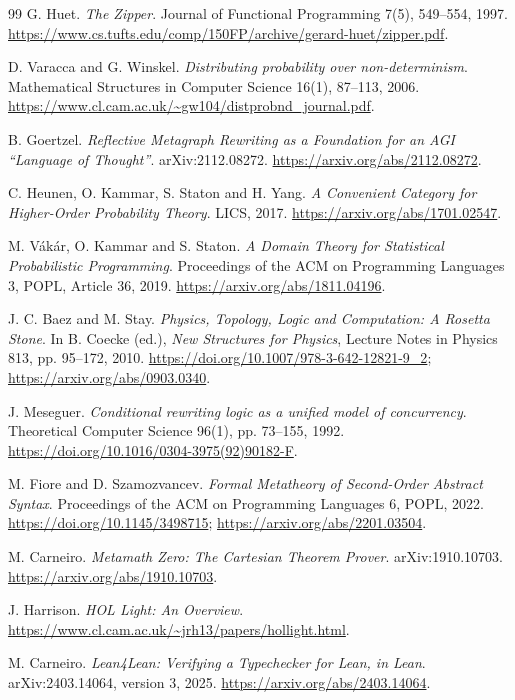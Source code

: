 \documentclass[11pt,a4paper]{article}
\begin{document}
\begin{thebibliography}{99}
G. Huet. \emph{The Zipper}. Journal of Functional Programming 7(5),
549--554, 1997.
\url{https://www.cs.tufts.edu/comp/150FP/archive/gerard-huet/zipper.pdf}.

D. Varacca and G. Winskel. \emph{Distributing probability over
non-determinism}. Mathematical Structures in Computer Science 16(1),
87--113, 2006.
\url{https://www.cl.cam.ac.uk/~gw104/distprobnd_journal.pdf}.

B. Goertzel. \emph{Reflective Metagraph Rewriting as a Foundation for an
AGI ``Language of Thought''}. arXiv:2112.08272.
\url{https://arxiv.org/abs/2112.08272}.

C. Heunen, O. Kammar, S. Staton and H. Yang.
\emph{A Convenient Category for Higher-Order Probability Theory}.
LICS, 2017. \url{https://arxiv.org/abs/1701.02547}.

M. V\'ak\'ar, O. Kammar and S. Staton.
\emph{A Domain Theory for Statistical Probabilistic Programming}.
Proceedings of the ACM on Programming Languages 3, POPL, Article 36, 2019.
\url{https://arxiv.org/abs/1811.04196}.

J. C. Baez and M. Stay.
\emph{Physics, Topology, Logic and Computation: A Rosetta Stone}.
In B. Coecke (ed.), \emph{New Structures for Physics},
Lecture Notes in Physics 813, pp. 95--172, 2010.
\url{https://doi.org/10.1007/978-3-642-12821-9_2};
\url{https://arxiv.org/abs/0903.0340}.

J. Meseguer. \emph{Conditional rewriting logic as a unified model of concurrency}.
Theoretical Computer Science 96(1), pp. 73--155, 1992.
\url{https://doi.org/10.1016/0304-3975(92)90182-F}.

M. Fiore and D. Szamozvancev.
\emph{Formal Metatheory of Second-Order Abstract Syntax}.
Proceedings of the ACM on Programming Languages 6, POPL, 2022.
\url{https://doi.org/10.1145/3498715};
\url{https://arxiv.org/abs/2201.03504}.

M. Carneiro. \emph{Metamath Zero: The Cartesian Theorem Prover}.
arXiv:1910.10703. \url{https://arxiv.org/abs/1910.10703}.

J. Harrison. \emph{HOL Light: An Overview}.
\url{https://www.cl.cam.ac.uk/~jrh13/papers/hollight.html}.

M. Carneiro. \emph{Lean4Lean: Verifying a Typechecker for Lean, in Lean}.
arXiv:2403.14064, version 3, 2025.
\url{https://arxiv.org/abs/2403.14064}.


\end{thebibliography}
\end{document}
